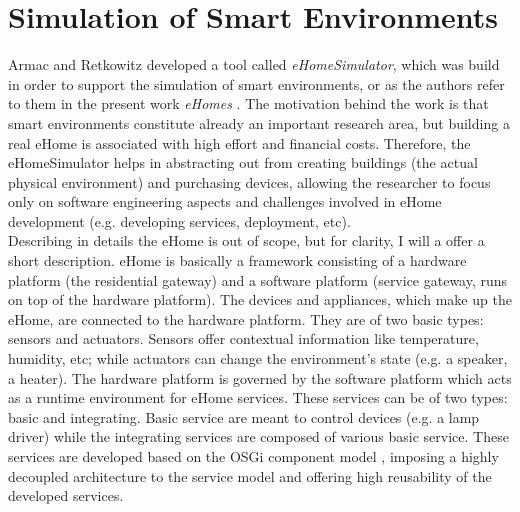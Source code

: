 \section{Simulation of Smart Environments}\label{sec:sim_of_smart_envs}

Armac and Retkowitz developed a tool called \emph{eHomeSimulator}, which was build in order to support the simulation of smart environments, or as the authors refer to them in the present work \emph{eHomes} \cite{armac2007simulation}. The motivation behind the work is that smart environments constitute already an important research area, but building a real eHome is associated with high effort and financial costs. Therefore, the eHomeSimulator helps in abstracting out from creating buildings (the actual physical environment) and purchasing devices, allowing the researcher to focus only on software engineering aspects and challenges involved in eHome development (e.g. developing services, deployment, etc).\\

Describing in details the eHome is out of scope, but for clarity, I will a offer a short description. eHome is basically a framework consisting of a hardware platform (the residential gateway) and a software platform (service gateway, runs on top of the hardware platform). The devices and appliances, which make up the eHome, are connected to the hardware platform. They are of two basic types: sensors and actuators. Sensors offer contextual information like temperature, humidity, etc; while actuators can change the environment's state (e.g. a speaker, a heater). The hardware platform is governed by the software platform which acts as a runtime environment for eHome services. These services can be of two types: basic and integrating. Basic service are meant to control devices (e.g. a lamp driver) while the integrating services are composed of various basic service. These services are developed based on the OSGi component model \cite{allianceosgi}, imposing a highly decoupled architecture to the service model and offering high reusability of the developed services.\\

